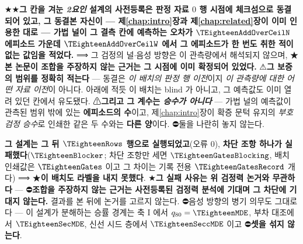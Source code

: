 \documentclass[11pt]{report}
\numberwithin{equation}{chapter}
\numberwithin{figure}{chapter}
\numberwithin{table}{chapter}
\begin{document}
★★\textbf{그 칸을 겨눈 \emph{2요인} 설계의 사전등록은 판정 자료 $0$ 행 시점에 체크섬으로
동결되어 있고, 그 동결본 자신이 --- 제\ref{chap:intro}장과 제\ref{chap:related}장이 이미
인용한 대로 --- %
가법 널이 그 결측 칸에 예측하는 오차가 $\TEighteenAddOverCeilN$
에피소드 가운데 $\TEighteenAddOverCeilW$ 에서 \textbf{그 에피소드가 한 번도 취한 적이
없는 값}임을 적었다.} ⟹ 그 검정의 널$\cdot$음성 방향은 이 관측량에서 해석되지 않으며,
★\textbf{본 논문이 조합을 주장하지 않는 근거는 그 시점에 이미 확정되어 있었다.}
⚠\textbf{그 보증의 범위를 정확히 적는다} --- 동결은 \emph{이 배치의 판정 행 이전}이지
\emph{이 관측량에 대한 어떤 자료 이전}이 아니다. 아래에 적듯 이 배치는 blind 가 아니고,
그 예측값도 이미 열려 있던 칸에서 유도됐다.
⚠\textbf{그리고 그 계수는 \emph{승수가 아니다}} --- 가법 널의 예측값이 관측된 범위 밖에
있는 \textbf{에피소드의 수}이고, 제\ref{chap:intro}장이 확증 문턱 유지의 \emph{부호검정
승수}로 인쇄한 같은 두 수와는 \textbf{다른 양}이다. ⛔둘을 나란히 놓지 않는다.

\textbf{그 설계는 그 뒤 $\TEighteenRows$ 행으로 실행되었고}(오류 $0$),
\textbf{차단 조항 하나가 실패했다}($\TEighteenBlocker$; 차단 조항만 세면
$\TEighteenGatesBlocking$, 배치 인쇄값은 $\TEighteenGates$ 이고 그 차이는 기록 전용
$\TEighteenGatesRecord$ 개다) ⟹ ★\textbf{이 배치도 라벨을 내지 못했다}.
★\textbf{그 실패 사유는 위 검정력 논거와 무관하다} --- ⛔\textbf{조합을 주장하지 않는
근거는 사전등록된 검정력 분석에 기대며 그 차단에 기대지 않는다.} 결과를 본 뒤에 논거를
고르지 않는다. ⛔음성 방향의 병기 의무도 그대로다 --- 이 설계가 분해하는 승률 경계는 축 I 에서
$q_{80} = \TEighteenMDE$, 부차 대조에서 $\TEighteenSecMDE$, 신선 시드 층에서
$\TEighteenSeccMDE$ 이고 ⛔\textbf{셋을 섞지 않는다}.
\end{document}
